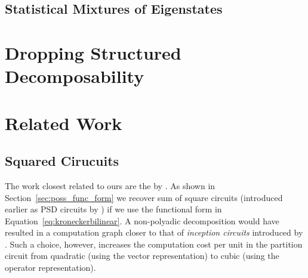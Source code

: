 \subsection{Statistical Mixtures of Eigenstates}
\label{sec:mixeigenstate}

























\section{Dropping Structured Decomposability}
\label{sec:nonstructdecomp}











\section{Related Work}
\label{sec:related}


\subsection{Squared Cirucuits}

The work closest related to ours are the  by \citet{loconte2024sum}.
As shown in Section~\ref{sec:poss_func_form} we recover sum of square circuits (introduced earlier as PSD circuits by \citet{sladek2023encoding}) if we use the functional form in Equation~\ref{eq:kroneckerbilinear}.
A non-polyadic decomposition would have resulted in a computation graph closer to that of \textit{inception circuits} introduced by \citet{wangrelationship}. Such a choice, however, increases the computation cost per unit in the partition circuit from quadratic (using the vector representation) to cubic (using the operator representation).

